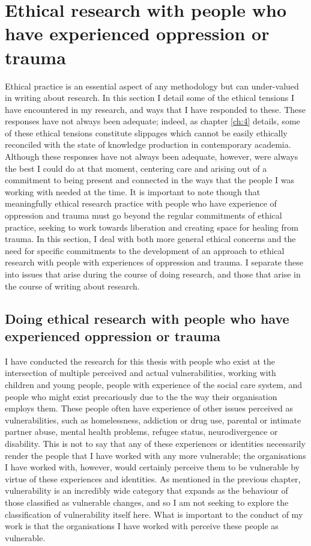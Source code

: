 \section{Ethical research with people who have experienced oppression or trauma}
\label{sec:3-4-ethics}
Ethical practice is an essential aspect of any methodology but can under-valued in writing about research. In this section I detail some of the ethical tensions I have encountered in my research, and ways that I have responded to these. These responses have not always been adequate; indeed, as chapter \ref{ch:4} details, some of these ethical tensions constitute slippages \citep{cutting_making_2021} which cannot be easily ethically reconciled with the state of knowledge production in contemporary academia. Although these responses have not always been adequate, however, were always the best I could do at that moment, centering care and arising out of a commitment to being present and connected in the ways that the people I was working with needed at the time. It is important to note though that meaningfully ethical research practice with people who have experience of oppression and trauma must go beyond the regular commitments of ethical practice, seeking to work towards liberation and creating space for healing from trauma. In this section, I deal with both more general ethical concerns and the need for specific commitments to the development of an approach to ethical research with people with experiences of oppression and trauma. I separate these into issues that arise during the course of doing research, and those that arise in the course of writing about research. 

\subsection{Doing ethical research with people who have experienced oppression or trauma}
I have conducted the research for this thesis with people who exist at the intersection of multiple perceived and actual vulnerabilities, working with children and young people, people with experience of the social care system, and people who might exist precariously due to the the way their organisation employs them. These people often have experience of other issues perceived as vulnerabilities, such as homelessness,  addiction or drug use, parental or intimate partner abuse, mental health problems, refugee status, neurodivergence or disability. This is not to say that any of these experiences or identities necessarily render the people that I have worked with any more vulnerable; the organisations I have worked with, however, would certainly perceive them to be vulnerable by virtue of these experiences and identities. As mentioned in the previous chapter, vulnerability is an incredibly wide category that expands as the behaviour of those classified as vulnerable changes, and so I am not seeking to explore the classification of vulnerability itself here. What is important to the conduct of my work is that the organisations I have worked with perceive these people as vulnerable. 

